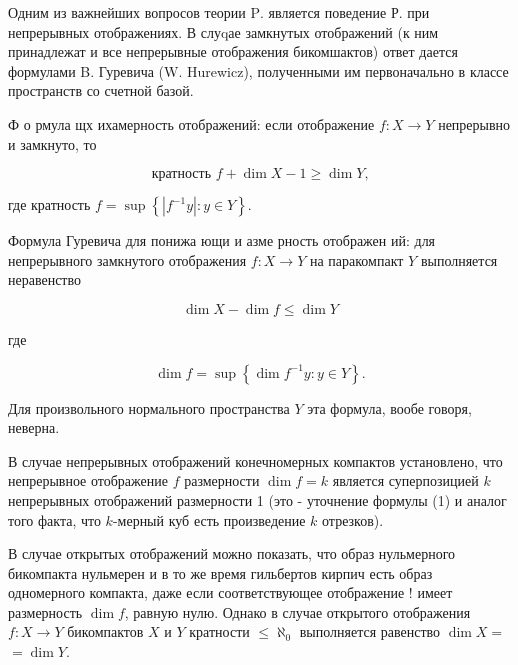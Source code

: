 \documentclass[10pt]{article}
\begin{document}
Одним из важнейших вопросов теории $\mathrm{P}$. является поведение Р. при непрерывных отображениях. В слуqае замкнутых отображений (к ним принадлежат и все непрерывные отображения бикомшактов) ответ дается формулами B. Гуревича (W. Hurewicz), полученными им первоначально в классе пространств со счетной базой.



Ф о рмула щх ихамерность отображений: если отображение $f: X \rightarrow Y$ непрерывно и замкнуто, то



\[

\text { кратность } f+\operatorname{dim} X-1 \geqslant \operatorname{dim} Y \text {, }

\]



где кратность $f=\sup \left\{\left|f^{-1} y\right|: y \in Y\right\}$.



Формула Гуревича для понижа ющи и азме рность отображен ий: для непрерывного замкнутого отображения $f: X \rightarrow Y$ на паракомпакт $Y$ выполняется неравенство



\[

\operatorname{dim} X-\operatorname{dim} f \leqslant \operatorname{dim} Y

\]



где



\[

\operatorname{dim} f=\sup \left\{\operatorname{dim} f^{-1} y: y \in Y\right\} .

\]



Для произвольного нормального пространства $Y$ эта формула, вообе говоря, неверна.



В случае непрерывных отображений конечномерных компактов установлено, что непрерывное отображение $f$ размерности $\operatorname{dim} f=k$ является суперпозицией $k$ непрерывных отображений размерности 1 (это - уточнение формулы (1) и аналог того факта, что $k$-мерный куб есть произведение $k$ отрезков).



В случае открытых отображений можно показать, что образ нульмерного бикомпакта нульмерен и в то же время гильбертов кирпич есть образ одномерного компакта, даже если соответствующее отображение ! имеет размерность $\operatorname{dim} f$, равную нулю. Однако в случае открытого отображения $f: X \rightarrow Y$ бикомпактов $X$ и $Y$ кратности $\leqslant \aleph_{0}$ выполняется равенство $\operatorname{dim} X=$ $=\operatorname{dim} Y$.
\end{document}
